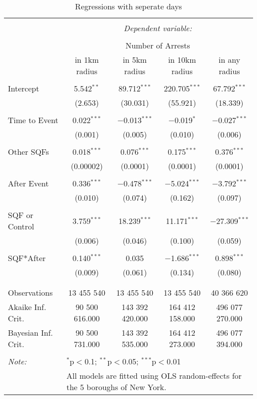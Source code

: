 
\begin{table}[!htbp] \centering 
  \caption{Regressions with seperate days} 
  \label{} 
\footnotesize 
\begin{tabular}{@{\extracolsep{3pt}}lcccc} 
\\[-1.8ex]\hline 
\hline \\[-1.8ex] 
 & \multicolumn{4}{c}{\textit{Dependent variable:}} \\ 
\cline{2-5} 
\\[-1.8ex] & \multicolumn{4}{c}{Number of Arrests \vspace*{0.2cm}} \\ 
 & in 1km radius & in 5km radius & in 10km radius & in any radius \\ 
\hline \\[-1.8ex] 
 Intercept & 5.542$^{**}$ & 89.712$^{***}$ & 220.705$^{***}$ & 67.792$^{***}$ \\ 
  & (2.653) & (30.031) & (55.921) & (18.339) \\ 
  & & & & \\ 
 Time to Event & 0.022$^{***}$ & $-$0.013$^{***}$ & $-$0.019$^{*}$ & $-$0.027$^{***}$ \\ 
  & (0.001) & (0.005) & (0.010) & (0.006) \\ 
  & & & & \\ 
 Other SQFs & 0.018$^{***}$ & 0.076$^{***}$ & 0.175$^{***}$ & 0.376$^{***}$ \\ 
  & (0.00002) & (0.0001) & (0.0001) & (0.0001) \\ 
  & & & & \\ 
 After Event & 0.336$^{***}$ & $-$0.478$^{***}$ & $-$5.024$^{***}$ & $-$3.792$^{***}$ \\ 
  & (0.010) & (0.074) & (0.162) & (0.097) \\ 
  & & & & \\ 
 SQF or Control & 3.759$^{***}$ & 18.239$^{***}$ & 11.171$^{***}$ & $-$27.309$^{***}$ \\ 
  & (0.006) & (0.046) & (0.100) & (0.059) \\ 
  & & & & \\ 
 SQF*After & 0.140$^{***}$ & 0.035 & $-$1.686$^{***}$ & 0.898$^{***}$ \\ 
  & (0.009) & (0.061) & (0.134) & (0.080) \\ 
  & & & & \\ 
\hline \\[-1.8ex] 
Observations & 13 455 540 & 13 455 540 & 13 455 540 & 40 366 620 \\ 
Akaike Inf. Crit. & 90 500 616.000 & 143 392 420.000 & 164 412 158.000 & 496 077 270.000 \\ 
Bayesian Inf. Crit. & 90 500 731.000 & 143 392 535.000 & 164 412 273.000 & 496 077 394.000 \\ 
\hline 
\hline \\[-1.8ex] 
\textit{Note:}  & \multicolumn{4}{l}{$^{*}$p$<$0.1; $^{**}$p$<$0.05; $^{***}$p$<$0.01} \\ 
 & \multicolumn{4}{l}{All models are fitted using OLS random-effects for the 5 boroughs of New York.} \\ 
\end{tabular} 
\end{table} 
